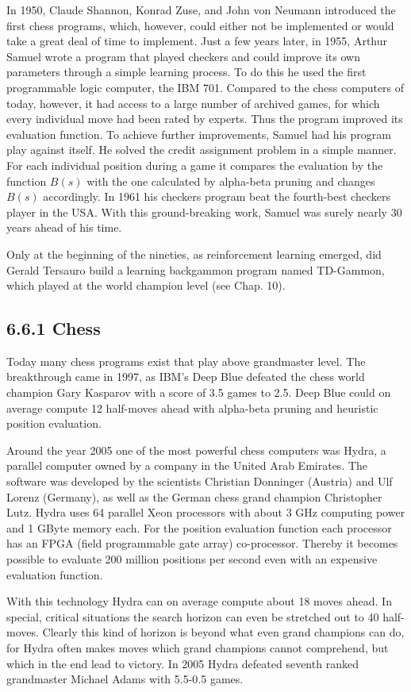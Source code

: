 \documentclass[10pt]{article}
\begin{document}
In 1950, Claude Shannon, Konrad Zuse, and John von Neumann introduced the first chess programs, which, however, could either not be implemented or would take a great deal of time to implement. Just a few years later, in 1955, Arthur Samuel wrote a program that played checkers and could improve its own parameters through a simple learning process. To do this he used the first programmable logic computer, the IBM 701. Compared to the chess computers of today, however, it had access to a large number of archived games, for which every individual move had been rated by experts. Thus the program improved its evaluation function. To achieve further improvements, Samuel had his program play against itself. He solved the credit assignment problem in a simple manner. For each individual position during a game it compares the evaluation by the function $B(s)$ with the one calculated by alpha-beta pruning and changes $B(s)$ accordingly. In 1961 his checkers program beat the fourth-best checkers player in the USA. With this ground-breaking work, Samuel was surely nearly 30 years ahead of his time.

Only at the beginning of the nineties, as reinforcement learning emerged, did Gerald Tersauro build a learning backgammon program named TD-Gammon, which played at the world champion level (see Chap. 10).

\subsection*{6.6.1 Chess}
Today many chess programs exist that play above grandmaster level. The breakthrough came in 1997, as IBM's Deep Blue defeated the chess world champion Gary Kasparov with a score of 3.5 games to 2.5. Deep Blue could on average compute 12 half-moves ahead with alpha-beta pruning and heuristic position evaluation.

Around the year 2005 one of the most powerful chess computers was Hydra, a parallel computer owned by a company in the United Arab Emirates. The software was developed by the scientists Christian Donninger (Austria) and Ulf Lorenz (Germany), as well as the German chess grand champion Christopher Lutz. Hydra uses 64 parallel Xeon processors with about 3 GHz computing power and 1 GByte memory each. For the position evaluation function each processor has an FPGA (field programmable gate array) co-processor. Thereby it becomes possible to evaluate 200 million positions per second even with an expensive evaluation function.

With this technology Hydra can on average compute about 18 moves ahead. In special, critical situations the search horizon can even be stretched out to 40 half-moves. Clearly this kind of horizon is beyond what even grand champions can do, for Hydra often makes moves which grand champions cannot comprehend, but which in the end lead to victory. In 2005 Hydra defeated seventh ranked grandmaster Michael Adams with 5.5-0.5 games.
\end{document}
